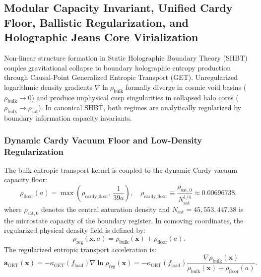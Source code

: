 \documentclass[11pt]{article}
\theoremstyle{plain}
\begin{document}
\subsection{Modular Capacity Invariant, Unified Cardy Floor, Ballistic Regularization, and Holographic Jeans Core Virialization}
\label{app:cardy-floor-jeans-virialization}
\label{app:cardy-jeans-core-virialization}
\label{app:jeans_virialization_cardy}

Non-linear structure formation in Static Holographic Boundary Theory (SHBT) couples gravitational collapse to boundary holographic entropy production through Causal-Point Generalized Entropic Transport (GET). Unregularized logarithmic density gradients $\nabla \ln \rho_{\mathrm{bulk}}$ formally diverge in cosmic void basins ($\rho_{\mathrm{bulk}} \to 0$) and produce unphysical cusp singularities in collapsed halo cores ($\rho_{\mathrm{bulk}} \to \rho_{\mathrm{sat}}$). In canonical SHBT, both regimes are analytically regularized by boundary information capacity invariants.

\subsubsection{Dynamic Cardy Vacuum Floor and Low-Density Regularization}
The bulk entropic transport kernel is coupled to the dynamic Cardy vacuum capacity floor:
\begin{equation}
\label{eq:cardy_floor_def}
\rho_{\mathrm{floor}}(a) = \max\left( \rho_{\mathrm{cardy\_floor}}, \, \frac{1}{39a} \right), \quad \rho_{\mathrm{cardy\_floor}} \equiv \frac{\rho_{\mathrm{sat},0}}{N_{\mathrm{sat}}^{1/4}} \approx 0.00696738,
\end{equation}
where $\rho_{\mathrm{sat},0}$ denotes the central saturation density and $N_{\mathrm{sat}} = 45{,}553{,}447.38$ is the microstate capacity of the boundary register. In comoving coordinates, the regularized physical density field is defined by:
\begin{equation}
\label{eq:rho_reg_def}
\rho_{\mathrm{reg}}(\mathbf{x}, a) = \rho_{\mathrm{bulk}}(\mathbf{x}) + \rho_{\mathrm{floor}}(a).
\end{equation}
The regularized entropic transport acceleration is:
\begin{equation}
\mathbf{a}_{\mathrm{GET}}(\mathbf{x}) = -\kappa_{\mathrm{GET}}(f_{\mathrm{load}}) \nabla \ln \rho_{\mathrm{reg}}(\mathbf{x}) = -\kappa_{\mathrm{GET}}(f_{\mathrm{load}}) \frac{\nabla \rho_{\mathrm{bulk}}(\mathbf{x})}{\rho_{\mathrm{bulk}}(\mathbf{x}) + \rho_{\mathrm{floor}}(a)}.
\end{equation}
\end{document}
